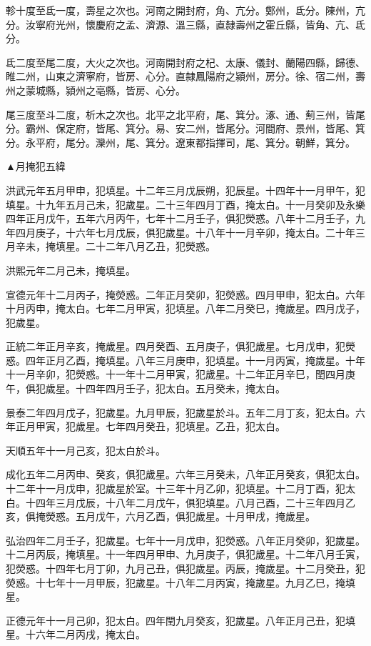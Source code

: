 \begin{pinyinscope}
軫十度至氐一度，壽星之次也。河南之開封府，角、亢分。鄭州，氐分。陳州，亢分。汝寧府光州，懷慶府之孟、濟源、溫三縣，直隸壽州之霍丘縣，皆角、亢、氐分。

氐二度至尾二度，大火之次也。河南開封府之杞、太康、儀封、蘭陽四縣，歸德、睢二州，山東之濟寧府，皆房、心分。直隸鳳陽府之潁州，房分。徐、宿二州，壽州之蒙城縣，潁州之亳縣，皆房、心分。

尾三度至斗二度，析木之次也。北平之北平府，尾、箕分。涿、通、薊三州，皆尾分。霸州、保定府，皆尾、箕分。易、安二州，皆尾分。河間府、景州，皆尾、箕分。永平府，尾分。灤州，尾、箕分。遼東都指揮司，尾、箕分。朝鮮，箕分。

▲月掩犯五緯

洪武元年五月甲申，犯填星。十二年三月戊辰朔，犯辰星。十四年十一月甲午，犯填星。十九年五月己未，犯歲星。二十三年四月丁酉，掩太白。十一月癸卯及永樂四年正月戊午，五年六月丙午，七年十二月壬子，俱犯熒惑。八年十二月壬子，九年四月庚子，十六年七月戊辰，俱犯歲星。十八年十一月辛卯，掩太白。二十年三月辛未，掩填星。二十二年八月乙丑，犯熒惑。

洪熙元年二月己未，掩填星。

宣德元年十二月丙子，掩熒惑。二年正月癸卯，犯熒惑。四月甲申，犯太白。六年十月丙申，掩太白。七年二月甲寅，犯填星。八年二月癸巳，掩歲星。四月戊子，犯歲星。

正統二年正月辛亥，掩歲星。四月癸酉、五月庚子，俱犯歲星。七月戊申，犯熒惑。四年正月乙酉，掩填星。八年三月庚申，犯填星。十一月丙寅，掩歲星。十年十一月辛卯，犯熒惑。十一年十二月甲寅，犯歲星。十二年正月辛巳，閏四月庚午，俱犯歲星。十四年四月壬子，犯太白。五月癸未，掩太白。

景泰二年四月戊子，犯歲星。九月甲辰，犯歲星於斗。五年二月丁亥，犯太白。六年正月甲寅，犯歲星。七年四月癸丑，犯填星。乙丑，犯太白。

天順五年十一月己亥，犯太白於斗。

成化五年二月丙申、癸亥，俱犯歲星。六年三月癸未，八年正月癸亥，俱犯太白。十二年十一月戊申，犯歲星於室。十三年十月乙卯，犯填星。十二月丁酉，犯太白。十四年三月戊辰，十八年二月戊午，俱犯填星。八月己酉，二十三年四月乙亥，俱掩熒惑。五月戊午，六月乙酉，俱犯歲星。十月甲戌，掩歲星。

弘治四年二月壬子，犯歲星。七年十一月戊申，犯熒惑。八年正月癸卯，犯歲星。十二月丙辰，掩填星。十一年四月甲申、九月庚子，俱犯歲星。十二年八月壬寅，犯熒惑。十四年七月丁卯，九月己丑，俱犯歲星。丙辰，掩歲星。十二月癸丑，犯熒惑。十七年十一月甲辰，犯歲星。十八年二月丙寅，掩歲星。九月乙巳，掩填星。

正德元年十一月己卯，犯太白。四年閏九月癸亥，犯歲星。八年正月己丑，犯填星。十六年二月丙戌，掩太白。


\end{pinyinscope}
